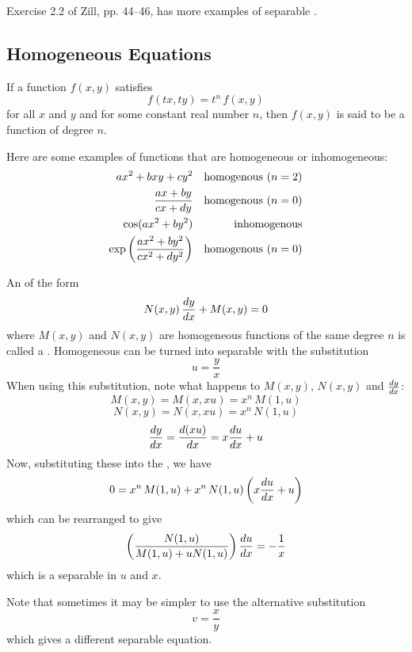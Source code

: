\begin{exercise}
Exercise 2.2 of Zill, pp. 44--46, has more examples of separable \ODEs.
\end{exercise}

\subsection{Homogeneous Equations}

If a function $f(x,y)$ satisfies
$$f(tx,ty)=t^n\,f(x,y)$$
for all $x$ and $y$ and for some constant real number $n$, then $f(x,y)$ is
said to be a  function of degree $n$.

\begin{example}
Here are some examples of functions that are homogeneous or inhomogeneous:
\begin{eqnarray*}
ax^2+bxy+cy^2 		&&  \mbox{homogenous ($n=2$)}	\\
\displaystyle\frac{ax+by}{cx+dy}	&&  \mbox{homogenous ($n=0$)}	\\
\cos(ax^2+by^2)		&&  \mbox{inhomogenous}	\\
\exp\left(\displaystyle\frac{ax^2+by^2}{cx^2+dy^2}\right)	
			&&  \mbox{homogenous ($n=0$)}	
\end{eqnarray*}
\end{example}

An \ODE of the form
$$N(x,y)\,\frac{dy}{dx}+M(x,y)=0$$
where $M(x,y)$ and $N(x,y)$ are homogeneous functions of the same degree $n$
is called a  \ODE.  Homogeneous \ODEs can be turned into 
separable \ODEs with the substitution
$$u=\frac{y}{x}$$
When using this substitution, note what happens to $M(x,y)$, $N(x,y)$ and
$\frac{dy}{dx}$:
$$M(x,y)=M(x,xu)=x^n\,M(1,u)$$
$$N(x,y)=N(x,xu)=x^n\,N(1,u)$$
$$\displaystyle\frac{dy}{dx}=\displaystyle\frac{d(xu)}{dx}=x\displaystyle\frac{du}{dx}+u$$
Now, substituting these into the \ODE, we have
$$0=x^n\,M(1,u)+x^n\,N(1,u)\left(x\frac{du}{dx}+u\right)$$
which can be rearranged to give
$$\left(\frac{N(1,u)}{M(1,u)+uN(1,u)}\right)\frac{du}{dx}=-\frac{1}{x}$$
which is a separable \ODE in $u$ and $x$.

Note that sometimes it may be simpler to use the alternative substitution
$$v=\frac{x}{y}$$
which gives a different separable equation.

